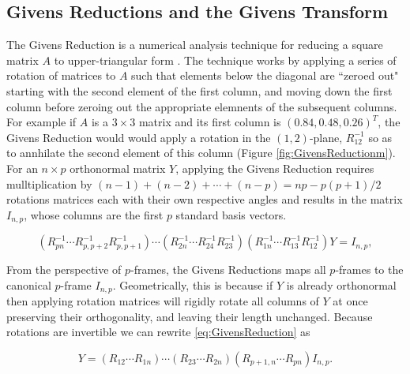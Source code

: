 \documentclass{article}
\begin{document}
\subsection{Givens Reductions and the Givens Transform}\label{GivensSub}
The Givens Reduction is a numerical analysis technique for reducing a square matrix $A$ to upper-triangular form \citep{meyer2000matrix}. The technique works by applying a series of rotation of matrices to $A$ such that elements below the diagonal are ``zeroed out" starting with the second element of the first column, and moving down the first column before zeroing out the appropriate elemnents of the subsequent columns. For example if $A$ is a $3 \times 3$ matrix and its first column is $(0.84, 0.48, 0.26)^T$, the Givens Reduction would would apply a rotation in the $(1,2)$-plane, $R_{12}^{-1}$ so as to annhilate the second element of this column (Figure \ref{fig:GivensReductionm}). For an $n \times p$ orthonormal matrix $Y$, applying the Givens Reduction requires mulltiplication by $(n-1)+(n-2)+\cdots+(n-p) = np -p(p+1)/2$ rotations matrices each with their own respective angles and results in the matrix$I_{n,p}$, whose columns are the first $p$ standard basis vectors.

\begin{equation}
\label{eq:GivensReduction}
(R_{pn}^{-1} \cdots R_{p,p+2}^{-1} R_{p,p+1}^{-1}) \cdots (R_{2n}^{-1} \cdots R_{24}^{-1} R_{23}^{-1})(R_{1n}^{-1} \cdots R_{13}^{-1}  R_{12}^{-1})Y = I_{n,p},
\end{equation}

From the perspective of $p$-frames, the Givens Reductions maps all $p$-frames to the canonical $p$-frame $I_{n,p}$. Geometrically, this is because if $Y$ is already orthonormal then applying rotation matrices will rigidly rotate all columns of $Y$ at once preserving their orthogonality, and leaving their length unchanged. Because rotations are invertible we can rewrite \ref{eq:GivensReduction} as

\begin{equation}
\label{eq:GivensRepresentation}
Y = (R_{12} \cdots R_{1n}) \cdots (R_{23} \cdots R_{2n}) (R_{p+1,n} \cdots R_{pn}) I_{n,p}.
\end{equation}
\end{document}
